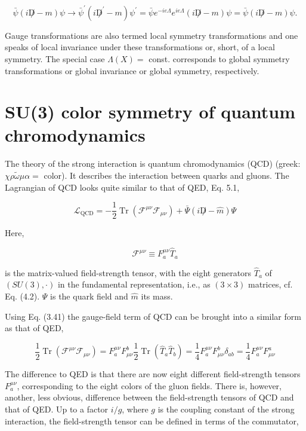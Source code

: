 \documentclass[10pt, letterpaper]{article}
\begin{document}
$$
\bar{\psi}(i \not D-m) \psi \longrightarrow \bar{\psi}^{\prime}\left(i \not D^{\prime}-m\right) \psi^{\prime}=\bar{\psi} e^{-i e \Lambda} e^{i e \Lambda}(i \not D-m) \psi=\bar{\psi}(i \not D-m) \psi .
$$

Gauge transformations are also termed local symmetry transformations and one speaks of local invariance under these transformations or, short, of a local symmetry. The special case $\Lambda(X)=$ const. corresponds to global symmetry transformations or global invariance or global symmetry, respectively.

\section{SU(3) color symmetry of quantum chromodynamics}
The theory of the strong interaction is quantum chromodynamics (QCD) (greek: $\chi \rho \widetilde{\omega} \mu \alpha=$ color). It describes the interaction between quarks and gluons. The Lagrangian of QCD looks quite similar to that of QED, Eq. 5.1,

$$
\mathcal{L}_{\mathrm{QCD}}=-\frac{1}{2} \operatorname{Tr}\left(\mathcal{F}^{\mu \nu} \mathcal{F}_{\mu \nu}\right)+\bar{\Psi}(i \not D-\hat{m}) \Psi
$$

Here,

$$
\mathcal{F}^{\mu \nu} \equiv F_{a}^{\mu \nu} \hat{T}_{a}
$$

is the matrix-valued field-strength tensor, with the eight generators $\hat{T}_{a}$ of $(S U(3), \cdot)$ in the fundamental representation, i.e., as $(3 \times 3)$ matrices, cf. Eq. (4.2). $\Psi$ is the quark field and $\hat{m}$ its mass.

Using Eq. (3.41) the gauge-field term of QCD can be brought into a similar form as that of QED,

$$
\frac{1}{2} \operatorname{Tr}\left(\mathcal{F}^{\mu \nu} \mathcal{F}_{\mu \nu}\right)=F_{a}^{\mu \nu} F_{\mu \nu}^{b} \frac{1}{2} \operatorname{Tr}\left(\hat{T}_{a} \hat{T}_{b}\right)=\frac{1}{4} F_{a}^{\mu \nu} F_{\mu \nu}^{b} \delta_{a b}=\frac{1}{4} F_{a}^{\mu \nu} F_{\mu \nu}^{a}
$$

The difference to QED is that there are now eight different field-strength tensors $F_{a}^{\mu \nu}$, corresponding to the eight colors of the gluon fields. There is, however, another, less obvious, difference between the field-strength tensors of QCD and that of QED. Up to a factor $i / g$, where $g$ is the coupling constant of the strong interaction, the field-strength tensor can be defined in terms of the commutator,
\end{document}
